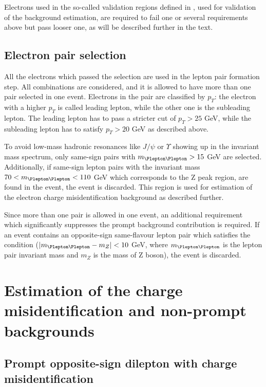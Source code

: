 Electrons used in the so-called validation regions defined in , used for validation of the background estimation, 
are required to fail one or several requirements above but pass looser one, as will be described further in the text.

\subsection{Electron pair selection}
All the electrons which passed the selection are used in the lepton pair formation step.
All combinations are considered, and it is allowed to have more than one pair selected in one event.
Electrons in the pair are classified by $p_T$: the electron with a higher $p_T$ is called leading lepton, while the other one is the subleading lepton.
The leading lepton has to pass a stricter cut of $p_T>25$ GeV, while the subleading lepton has to satisfy $p_T>20$ GeV as described above.

To avoid low-mass hadronic resonances like $J/\psi$ or $\varUpsilon$ showing up in the invariant mass spectrum, 
only same-sign pairs with $m_{\Plepton\Plepton}>15$ GeV are selected.
Additionally, if same-sign lepton pairs with the invariant mass $70 < m_{\Plepton\Plepton}< 110$ GeV 
which corresponds to the Z peak region, are found in the event, the event is discarded.
This region is used for estimation of the electron charge misidentification background as described further.

Since more than one pair is allowed in one event, an additional requirement which significantly suppresses the prompt background contribution is required.
If an event contains an opposite-sign same-flavour lepton pair which satisfies the condition ($|m_{\Plepton\Plepton} - m_{Z}| < 10$ GeV,
where $m_{\Plepton\Plepton}$ is the lepton pair invariant mass and $m_{Z}$ is the mass of Z boson), the event is discarded.

\section{Estimation of the charge misidentification and non-prompt backgrounds}

\subsection{Prompt opposite-sign dilepton with charge misidentification}
\label{subsec:CF_definition}

